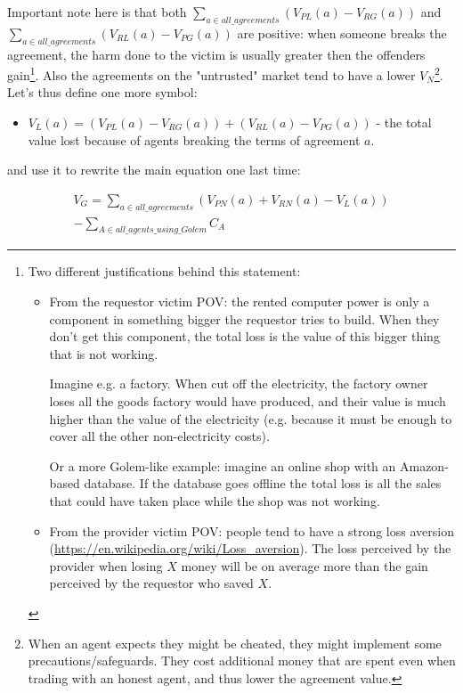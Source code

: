 \documentclass{article}
\begin{document}
Important note here is that both $\sum_{a \in all\_agreements}(V_{PL}(a)- V_{RG}(a))$ and $\sum_{a \in all\_agreements}(V_{RL}(a)- V_{PG}(a))$ are positive: 
when someone breaks the agreement, the harm done to the victim is usually greater then the offenders gain\footnote{
    Two different justifications behind this statement:
    \begin{itemize}
        \item From the requestor victim POV: the rented computer power is only a component in something bigger the requestor tries to build.
            When they don't get this component, the total loss is the value of this bigger thing that is not working.
            
            Imagine e.g. a factory. When cut off the electricity, the factory owner loses all the goods factory would have produced, and their value
            is much higher than the value of the electricity (e.g. because it must be enough to cover all the other non-electricity costs).

            Or a more Golem-like example: imagine an online shop with an Amazon-based database. If the database goes offline the total loss is all the
            sales that could have taken place while the shop was not working.
        \item From the provider victim POV: people tend to have a strong loss aversion
            (\href{https://en.wikipedia.org/wiki/Loss\_aversion}{https://en.wikipedia.org/wiki/Loss\_aversion}).
            The loss perceived by the provider when losing $X$ money will be on average more than the gain perceived by the requestor who saved $X$.
    \end{itemize}
}. Also the agreements on the "untrusted" market tend to have a lower $V_N$\footnote{
    When an agent expects they might be cheated, they might implement some precautions/safeguards. They cost additional money that are spent even when
    trading with an honest agent, and thus lower the agreement value.}.
Let's thus define one more symbol:
\begin{itemize}
\item $V_L(a) = (V_{PL}(a)- V_{RG}(a)) + (V_{RL}(a)- V_{PG}(a))$ - the total value lost because of agents breaking the terms of agreement $a$.
\end{itemize}
and use it to rewrite the main equation one last time:

\begin{equation}
\begin{split}
    V_G = \sum_{a \in all\_agreements}(V_{PN}(a) + V_{RN}(a) - V_L(a)) \\
          - \sum_{A \in all\_agents\_using\_Golem}C_A
\end{split}
\end{equation}
\end{document}
